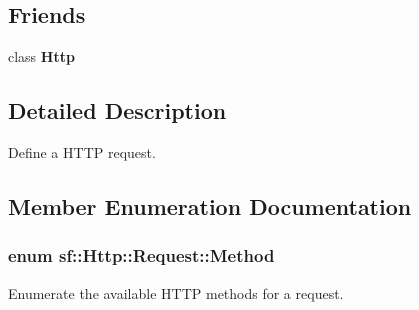 \subsection*{Friends}
\begin{DoxyCompactItemize}
\item 
\hypertarget{classsf_1_1_http_1_1_request_aba95e2a7762bb5df986048b05d03a22e}{class {\bfseries Http}}\label{classsf_1_1_http_1_1_request_aba95e2a7762bb5df986048b05d03a22e}

\end{DoxyCompactItemize}


\subsection{Detailed Description}
Define a H\+T\+T\+P request. 

\subsection{Member Enumeration Documentation}
\hypertarget{classsf_1_1_http_1_1_request_a620f8bff6f43e1378f321bf53fbf5598}{
\subsubsection[{Method}]{\setlength{\rightskip}{0pt plus 5cm}enum {\bf sf\+::\+Http\+::\+Request\+::\+Method}}}\label{classsf_1_1_http_1_1_request_a620f8bff6f43e1378f321bf53fbf5598}


Enumerate the available H\+T\+T\+P methods for a request. 

